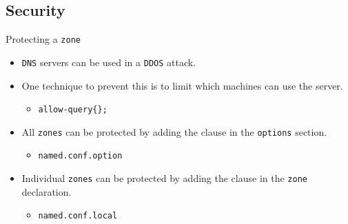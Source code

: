 \documentclass[xcolor=table]{beamer}
\begin{document}
\subsection{Security}
\begin{frame}{Protecting a \texttt{zone}}
  \begin{itemize}
    \item \texttt{DNS} servers can be used in a \texttt{DDOS} attack.
    \item One technique to prevent this is to limit which machines can use the server.
      \begin{itemize}
        \item \texttt{allow-query\{\};}
      \end{itemize}
    \item All \texttt{zones} can be protected by adding the clause in the \texttt{options} section.  
      \begin{itemize}
        \item \texttt{named.conf.option}
      \end{itemize}
    \item Individual \texttt{zones} can be protected by adding the clause in the \texttt{zone} declaration.  
    \begin{itemize}
      \item \texttt{named.conf.local}
    \end{itemize}
  \end{itemize}
\end{frame}
\end{document}
